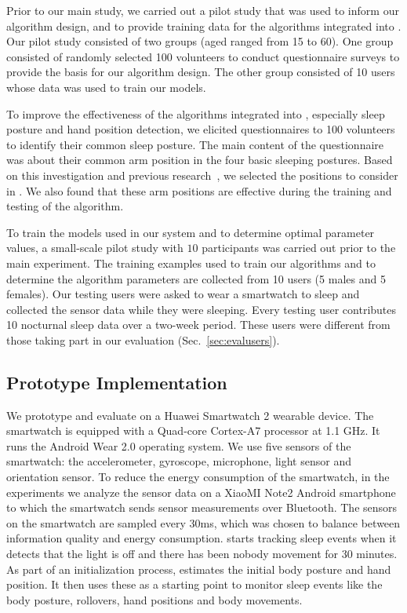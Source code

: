 Prior to our main study, we carried out a pilot study that was used to inform our algorithm design, and to provide training data for the
algorithms integrated into {\systemname}. Our pilot study consisted of two groups (aged ranged from 15 to 60). One group   {consisted of}
randomly selected 100 volunteers to conduct questionnaire surveys to provide the basis for our algorithm design. The other group consisted
of 10 users whose data was used to train our models.


To improve the effectiveness of the algorithms integrated into {\systemname}, especially sleep posture and hand position detection, we
elicited questionnaires to 100 volunteers to identify their common sleep posture. The main content of the questionnaire was about their
common arm position in the four basic sleeping postures. Based on this investigation and previous
research~\cite{position2014,HandPosition2}, we selected the positions to consider in {\systemname}. We also found that these arm positions
are effective during the training and testing of the algorithm.

To train the models used in our system and to determine optimal parameter values, a small-scale pilot study with $10$ participants was
carried out prior to the main experiment. The training examples used to train our algorithms and to determine the algorithm parameters are
collected from 10 users (5 males and 5 females). Our testing users were asked to wear a smartwatch to sleep and collected the sensor data
while they were sleeping. Every testing user contributes 10 nocturnal sleep data over a two-week period. These users were different from
those taking part in our evaluation (Sec.~\ref{sec:evalusers}).



\subsection{Prototype Implementation \label{sec:implementation}}
We prototype and evaluate {\systemname} on a Huawei Smartwatch 2 wearable device. The smartwatch is equipped with a Quad-core Cortex-A7 processor at 1.1 GHz. It runs the Android Wear 2.0 operating system. We use five sensors of the smartwatch: the accelerometer, gyroscope, microphone, light sensor and orientation sensor. To reduce the energy consumption of the smartwatch, in the experiments we analyze the sensor data on a XiaoMI Note2 Android smartphone to which the smartwatch sends sensor measurements over Bluetooth. The sensors on the smartwatch are sampled every $30$ms, which was chosen to balance between information quality and energy consumption. {\systemname} starts tracking sleep events when it detects that the light is off and there has been nobody movement for 30 minutes. As part of an initialization process, {\systemname} estimates the initial body posture and hand position. It then uses these as a starting point to monitor sleep events like the body posture, rollovers, hand positions and body movements.
